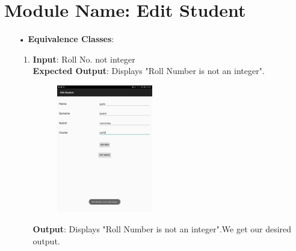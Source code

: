 \documentclass{scrreprt}
\begin{document}
\section{Module Name: Edit Student}
\begin{itemize}
\item[•]\textbf{Equivalence Classes}:
\begin{enumerate}
\item \textbf{Input}: Roll No. not integer \\
\textbf{Expected Output}: Displays "Roll Number is not an integer".
\begin{figure}[H]
\centering
\includegraphics[width=0.42\textwidth, keepaspectratio]{editrollnot.jpg}
\end{figure}
\textbf{Output}: Displays "Roll Number is not an integer".We get our desired output.


\end{enumerate}
\end{itemize}
\end{document}
